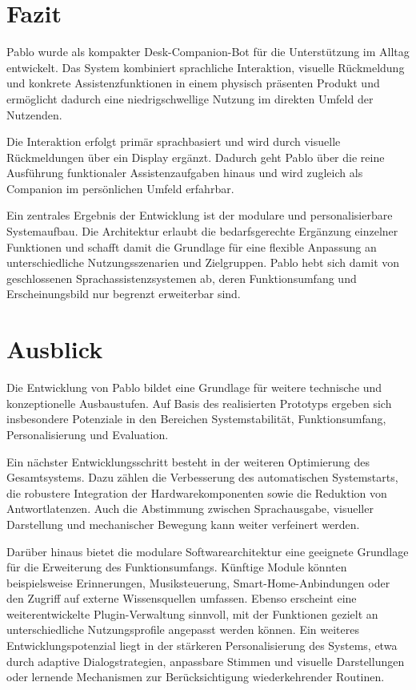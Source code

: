 \section{Fazit}
Pablo wurde als kompakter Desk-Companion-Bot für die Unterstützung im Alltag entwickelt. Das System kombiniert sprachliche Interaktion, visuelle Rückmeldung und konkrete Assistenzfunktionen in einem physisch präsenten Produkt und ermöglicht dadurch eine niedrigschwellige Nutzung im direkten Umfeld der Nutzenden.

Die Interaktion erfolgt primär sprachbasiert und wird durch visuelle Rückmeldungen über ein Display ergänzt. Dadurch geht Pablo über die reine Ausführung funktionaler Assistenzaufgaben hinaus und wird zugleich als Companion im persönlichen Umfeld erfahrbar.

Ein zentrales Ergebnis der Entwicklung ist der modulare und personalisierbare Systemaufbau. Die Architektur erlaubt die bedarfsgerechte Ergänzung einzelner Funktionen und schafft damit die Grundlage für eine flexible Anpassung an unterschiedliche Nutzungsszenarien und Zielgruppen. Pablo hebt sich damit von geschlossenen Sprachassistenzsystemen ab, deren Funktionsumfang und Erscheinungsbild nur begrenzt erweiterbar sind.


\section{Ausblick}

Die Entwicklung von Pablo bildet eine Grundlage für weitere technische und konzeptionelle Ausbaustufen.
Auf Basis des realisierten Prototyps ergeben sich insbesondere Potenziale in den Bereichen Systemstabilität, Funktionsumfang, Personalisierung und Evaluation.

Ein nächster Entwicklungsschritt besteht in der weiteren Optimierung des Gesamtsystems.
Dazu zählen die Verbesserung des automatischen Systemstarts, die robustere Integration der Hardwarekomponenten sowie die Reduktion von Antwortlatenzen.
Auch die Abstimmung zwischen Sprachausgabe, visueller Darstellung und mechanischer Bewegung kann weiter verfeinert werden.

Darüber hinaus bietet die modulare Softwarearchitektur eine geeignete Grundlage für die Erweiterung des Funktionsumfangs.
Künftige Module könnten beispielsweise Erinnerungen, Musiksteuerung, Smart-Home-Anbindungen oder den Zugriff auf externe Wissensquellen umfassen.
Ebenso erscheint eine weiterentwickelte Plugin-Verwaltung sinnvoll, mit der Funktionen gezielt an unterschiedliche Nutzungsprofile angepasst werden können.
Ein weiteres Entwicklungspotenzial liegt in der stärkeren Personalisierung des Systems, etwa durch adaptive Dialogstrategien, anpassbare Stimmen und visuelle Darstellungen oder lernende Mechanismen zur Berücksichtigung wiederkehrender Routinen.

